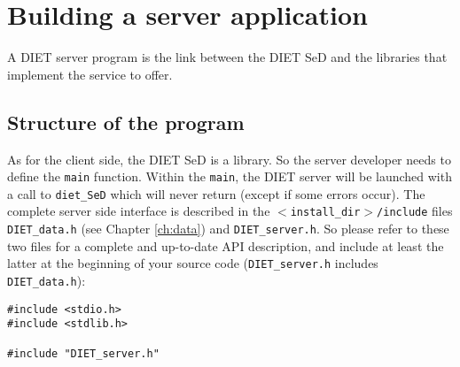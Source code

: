 
\chapter{Building a server application}
\label{ch:server}

A DIET server program is the link between the DIET SeD and the libraries that
implement the service to offer.

\section{Structure of the program}
\label{sec:sv_struct}

As for the client side, the DIET SeD is a library. So the server developer needs
to define the \texttt{main} function. Within the \texttt{main}, the DIET server
will be launched with a call to \texttt{diet\_SeD} which will never return
(except if some errors occur). The complete server side interface is described
in the \texttt{$<$install\_dir$>$/include} files \texttt{DIET\_data.h} (see
Chapter \ref{ch:data}) and \texttt{DIET\_server.h}. So please refer to these two
files for a complete and up-to-date API description, and include at least the
latter at the beginning of your source code (\texttt{DIET\_server.h} includes
\texttt{DIET\_data.h}):
{\footnotesize
\begin{verbatim}
#include <stdio.h>
#include <stdlib.h>

#include "DIET_server.h"
\end{verbatim}
}

